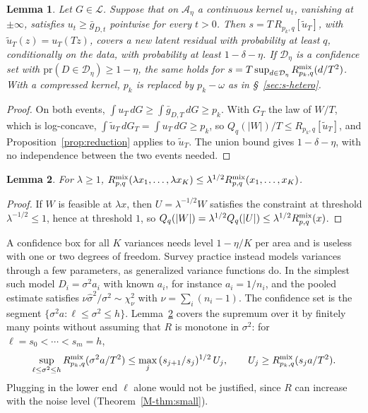 \documentclass[11pt]{article}
\renewcommand{\_}{\usc\allowbreak}
\newtheorem{lemma}{Lemma}
\newcommand{\pr}{\mathrm{pr}}
\newcommand{\LC}{\mathcal{L}}
\begin{document}
\begin{lemma}\label{lem:dominate}
Let $G \in \LC$. Suppose that on $\mathcal A_\eta$ a continuous kernel $u_t$, vanishing at $\pm\infty$, satisfies $u_t \ge \bar g_{D,t}$ pointwise for every $t > 0$. Then $s = T\,R_{p_k,q}[\widetilde u_T]$, with $\widetilde u_T(z) = u_T(Tz)$, covers a new latent residual with probability at least $q$, conditionally on the data, with probability at least $1 - \delta - \eta$. If $\mathcal D_\eta$ is a confidence set with $\pr(D \in \mathcal D_\eta) \ge 1 - \eta$, the same holds for $s = T\sup_{d \in \mathcal D_\eta} R^{\rm mix}_{p_k,q}(d/T^2)$. With a compressed kernel, $p_k$ is replaced by $p_k - \omega$ as in \S~\ref{sec:s-hetero}.
\end{lemma}

\begin{proof}
On both events, $\int u_T\,dG \ge \int \bar g_{D,T}\,dG \ge p_k$. With $G_T$ the law of $W/T$, which is log-concave, $\int \widetilde u_T\,dG_T = \int u_T\,dG \ge p_k$, so $Q_q(|W|)/T \le R_{p_k,q}[\widetilde u_T]$, and Proposition~\ref{prop:reduction} applies to $\widetilde u_T$. The union bound gives $1 - \delta - \eta$, with no independence between the two events needed.
\end{proof}

\begin{lemma}\label{lem:scale}
For $\lambda \ge 1$, $R^{\rm mix}_{p,q}(\lambda x_1, \ldots, \lambda x_K) \le \lambda^{1/2} R^{\rm mix}_{p,q}(x_1, \ldots, x_K)$.
\end{lemma}

\begin{proof}
If $W$ is feasible at $\lambda x$, then $U = \lambda^{-1/2}W$ satisfies the constraint at threshold $\lambda^{-1/2} \le 1$, hence at threshold $1$, so $Q_q(|W|) = \lambda^{1/2}Q_q(|U|) \le \lambda^{1/2}R^{\rm mix}_{p,q}(x)$.
\end{proof}

A confidence box for all $K$ variances needs level $1 - \eta/K$ per area and is useless with one or two degrees of freedom. Survey practice instead models variances through a few parameters, as generalized variance functions do. In the simplest such model $D_i = \sigma^2 a_i$ with known $a_i$, for instance $a_i = 1/n_i$, and the pooled estimate satisfies $\nu\hat\sigma^2/\sigma^2 \sim \chi^2_\nu$ with $\nu = \sum_i(n_i - 1)$. The confidence set is the segment $\{\sigma^2 a : \ell \le \sigma^2 \le h\}$. Lemma~\ref{lem:scale} covers the supremum over it by finitely many points without assuming that $R$ is monotone in $\sigma^2$: for $\ell = s_0 < \cdots < s_m = h$,
\[
\sup_{\ell \le \sigma^2 \le h} R^{\rm mix}_{p_k,q}(\sigma^2 a/T^2) \le \max_j\,(s_{j+1}/s_j)^{1/2}\,U_j, \qquad U_j \ge R^{\rm mix}_{p_k,q}(s_j a/T^2).
\]
Plugging in the lower end $\ell$ alone would not be justified, since $R$ can increase with the noise level (Theorem~\ref{M-thm:small}).
\end{document}
